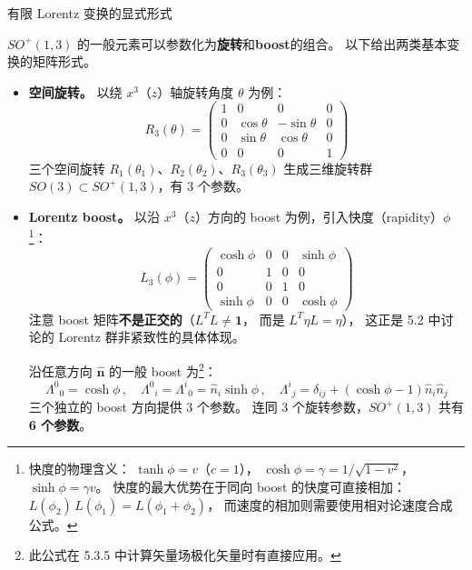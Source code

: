 \begin{center}
  \large 有限 Lorentz 变换的显式形式
\end{center}
\vspace{2ex}
$SO^+(1,3)$ 的一般元素可以参数化为\textbf{旋转}和\textbf{boost}的组合。
以下给出两类基本变换的矩阵形式。
\begin{itemize}
  \item \textbf{空间旋转。}
    以绕 $x^3$（$z$）轴旋转角度 $\theta$ 为例：
    \begin{equation}\label{eq:rotation-z}
      R_3(\theta) =
      \begin{pmatrix}
        1 & 0 & 0 & 0\\
        0 & \cos\theta & -\sin\theta & 0\\
        0 & \sin\theta & \cos\theta & 0\\
        0 & 0 & 0 & 1
      \end{pmatrix}
    \end{equation}
    三个空间旋转 $R_1(\theta_1)$、$R_2(\theta_2)$、$R_3(\theta_3)$
    生成三维旋转群 $SO(3) \subset SO^+(1,3)$，有 3 个参数。
  \item \textbf{Lorentz boost。}
以沿 $x^3$（$z$）方向的 boost 为例，引入快度（rapidity）$\phi$\footnote{
快度的物理含义：
$\tanh\phi = v$（$c=1$），
$\cosh\phi = \gamma = 1/\sqrt{1-v^2}$，
$\sinh\phi = \gamma v$。
快度的最大优势在于同向 boost 的快度可直接相加：
$L(\phi_2)\,L(\phi_1) = L(\phi_1 + \phi_2)$，
而速度的相加则需要使用相对论速度合成公式。}：
\begin{equation}\label{eq:boost-z}
  L_3(\phi) =
  \begin{pmatrix}
    \cosh\phi & 0 & 0 & \sinh\phi\\
    0 & 1 & 0 & 0\\
    0 & 0 & 1 & 0\\
    \sinh\phi & 0 & 0 & \cosh\phi
  \end{pmatrix}
\end{equation}
注意 boost 矩阵\textbf{不是正交的}（$L^T L \neq \mathbf{1}$，
而是 $L^T\eta L = \eta$），
这正是 5.2 中讨论的 Lorentz 群非紧致性的具体体现。

沿任意方向 $\hat{\mathbf{n}}$ 的一般 boost 为\footnote{
此公式在 5.3.5 中计算矢量场极化矢量时有直接应用。}：
\begin{equation}\label{eq:general-boost}
  \Lambda^0{}_0 = \cosh\phi\,,\quad
  \Lambda^0{}_i = \Lambda^i{}_0 = \hat{n}_i\sinh\phi\,,\quad
  \Lambda^i{}_j = \delta_{ij} + (\cosh\phi - 1)\hat{n}_i\hat{n}_j
\end{equation}
三个独立的 boost 方向提供 3 个参数。
连同 3 个旋转参数，$SO^+(1,3)$ 共有 \textbf{6 个参数}。
\end{itemize}





